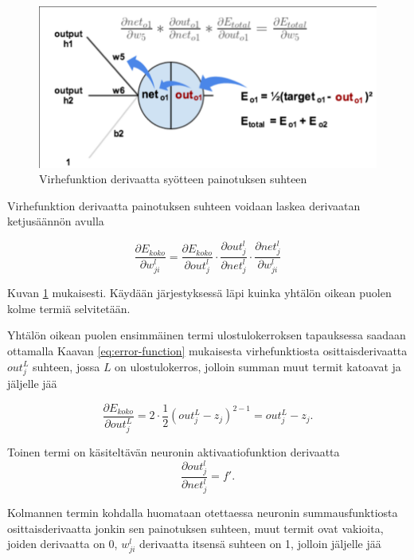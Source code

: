 \documentclass[finnish]{tktltiki2}
\theoremstyle{definition}
\theoremstyle{remark}
\begin{document}


    \begin{figure}[h]
      \centering
      \includegraphics[scale=0.4]{chain-rule}
      \caption{Virhefunktion derivaatta syötteen painotuksen suhteen}
      \label{pic:chain-rule}
    \end{figure}

    Virhefunktion derivaatta painotuksen suhteen voidaan laskea derivaatan ketjusäännön avulla

    $$ \frac{\partial E_{koko}}{\partial w_{ji}^l} = \frac{\partial E_{koko}}{\partial out_j^{l}} \cdot \frac{\partial out_j^{l}}{\partial net_j^{l}} \cdot \frac{\partial net_j^{l}}{\partial w_{ji}^l}$$

    \noindent Kuvan \ref{pic:chain-rule} mukaisesti. Käydään järjestyksessä läpi kuinka yhtälön oikean puolen kolme termiä selvitetään. 
    
    Yhtälön oikean puolen ensimmäinen termi ulostulokerroksen tapauksessa saadaan ottamalla Kaavan \ref{eq:error-function} mukaisesta virhefunktiosta osittaisderivaatta $out_j^{L}$ suhteen, jossa $L$ on ulostulokerros, jolloin summan muut termit katoavat ja jäljelle jää 

    $$\frac{\partial E_{koko}}{\partial out_j^{L}} = 2 \cdot \frac{1}{2} (out_{j}^{L} - z_j)^{2-1} = out_{j}^{L} - z_j.$$
    
    \noindent Toinen termi on käsiteltävän neuronin aktivaatiofunktion derivaatta
    $$\frac{\partial out_j^{l}}{\partial net_j^{l}} = f'.$$

    \noindent Kolmannen termin kohdalla huomataan otettaessa neuronin summausfunktiosta osittaisderivaatta jonkin sen painotuksen suhteen, muut termit ovat vakioita, joiden derivaatta on 0, $w_{ji}^l$ derivaatta itsensä suhteen on 1, jolloin jäljelle jää
\end{document}

